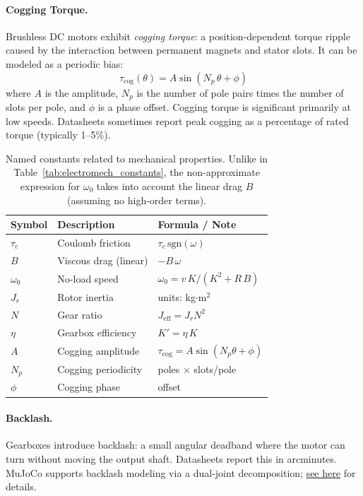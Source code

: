 \documentclass[10pt, a4paper, twocolumn]{article}
\begin{document}
\paragraph{Cogging Torque.}
Brushless DC motors exhibit \emph{cogging torque}: a position-dependent torque ripple caused by the interaction between permanent magnets and stator slots. It can be modeled as a periodic bias:
\begin{equation}
  \tau_{\text{cog}}(\theta) = A \sin(N_p \, \theta + \phi)
  \label{eq:cogging}
\end{equation}
where $A$ is the amplitude, $N_p$ is the number of pole pairs times the number of slots per pole, and $\phi$ is a phase offset. Cogging torque is significant primarily at low speeds. Datasheets sometimes report peak cogging as a percentage of rated torque (typically 1--5\%).

\begin{table}[H]
\centering
\footnotesize
\setlength{\tabcolsep}{3pt}
\renewcommand{\arraystretch}{1.2}
\begin{tabular}{@{}lll@{}}
\toprule
Symbol & Description & Formula / Note \\
\midrule
$\tau_c$ & Coulomb friction & $\tau_c\,\text{sgn}(\omega)$ \\
$B$ & Viscous drag (linear) & $-B\,\omega$ \\
$\omega_0$ & No-load speed &
  $\omega_0 = v\,K / (K^2 + R\,B)$ \\
$J_r$ & Rotor inertia & units: kg$\cdot$m$^2$ \\
$N$ & Gear ratio & $J_{\text{eff}} = J_r N^2$ \\
$\eta$ & Gearbox efficiency & $K' = \eta \, K$ \\
$A$ & Cogging amplitude & $\tau_{\text{cog}} = A\sin(N_p\theta + \phi)$ \\
$N_p$ & Cogging periodicity & poles $\times$ slots/pole \\
$\phi$ & Cogging phase & offset \\
\bottomrule
\end{tabular}
\caption{Named constants related to mechanical properties. Unlike in Table~\ref{tab:electromech_constants}, the non-approximate expression for $\omega_0$ takes into account the linear drag $B$ (assuming no high-order terms).}
\label{tab:key_constants}
\end{table}

\paragraph{Backlash.}
Gearboxes introduce backlash: a small angular deadband where the motor can turn without moving the output shaft. Datasheets report this in arcminutes. MuJoCo supports backlash modeling via a dual-joint decomposition; \href{https://mujoco.readthedocs.io/en/stable/modeling.html#backlash}{see here} for details.
\end{document}
